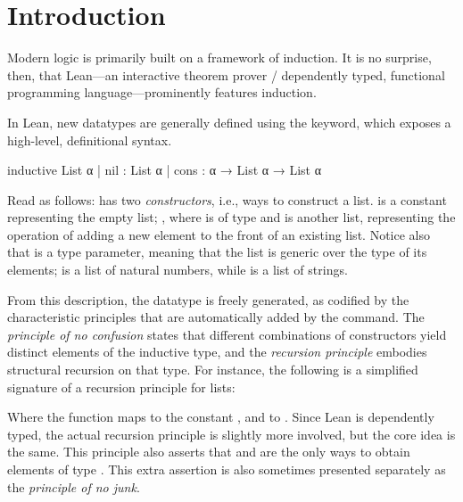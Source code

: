 \chapter{Introduction}%
\label{ch:intro}


Modern logic is primarily built on a framework of induction.
It is no surprise, then, that Lean---an interactive theorem prover / dependently typed, functional programming language---prominently features induction.

In Lean, new datatypes are generally defined using the \inductive{} keyword, which exposes a high-level, definitional syntax.

\begin{leancode}
  inductive List α 
    | nil  : List α
    | cons : α → List α → List α
\end{leancode}

Read as follows:  has two \emph{constructors}, i.e., ways to construct a list.
 is a constant
representing the empty list; 
, where  is of type  and  is another list, representing the operation of adding a new element to the front of an existing list. Notice also that  is a type parameter, meaning that the list is generic over the type of its elements;  is a list of natural numbers, while  is a list of strings.

From this description, the datatype is freely generated, as codified by the characteristic principles that are automatically added by the \inductive{} command.
The \emph{principle of no confusion} states that different combinations of constructors yield distinct elements of the inductive type, and the \emph{recursion principle} embodies structural recursion on that type. For instance, the following is a simplified signature of a recursion principle for lists:
\begin{center}
\end{center}
Where the function  maps  to the constant , and  to . Since Lean is dependently typed, the actual recursion principle is slightly more involved, but the core idea is the same.
This principle also asserts that  and  are the only ways to obtain elements of type . This extra assertion is also sometimes presented separately as the \emph{principle of no junk}.


